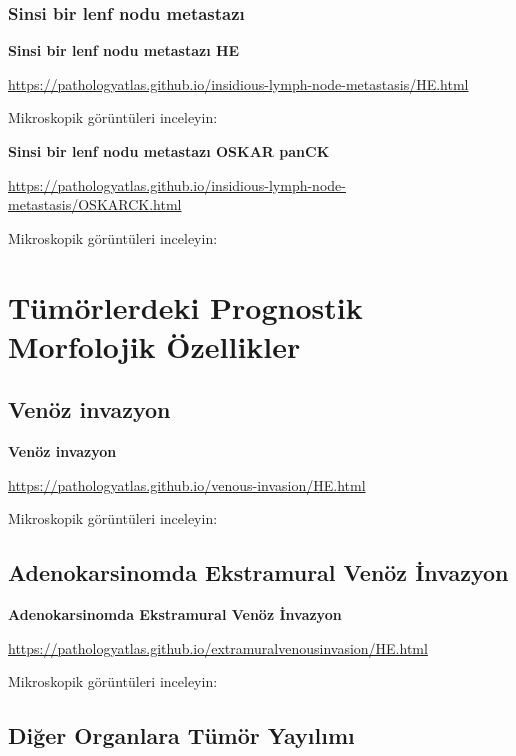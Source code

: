 \documentclass[
  letterpaper,
  DIV=11,
  numbers=noendperiod]{scrreprt}
\begin{document}
\hypertarget{sinsi-bir-lenf-nodu-metastazux131}{%
\section{Sinsi bir lenf nodu
metastazı}\label{sinsi-bir-lenf-nodu-metastazux131}}

\textbf{Sinsi bir lenf nodu metastazı HE}

\url{https://pathologyatlas.github.io/insidious-lymph-node-metastasis/HE.html}

Mikroskopik görüntüleri inceleyin:

\textbf{Sinsi bir lenf nodu metastazı OSKAR panCK}

\url{https://pathologyatlas.github.io/insidious-lymph-node-metastasis/OSKARCK.html}

Mikroskopik görüntüleri inceleyin:

\part{Tümörlerdeki Prognostik Morfolojik Özellikler}

\hypertarget{venuxf6z-invazyon}{%
\chapter{Venöz invazyon}\label{venuxf6z-invazyon}}

\textbf{Venöz invazyon}

\url{https://pathologyatlas.github.io/venous-invasion/HE.html}

Mikroskopik görüntüleri inceleyin:

\hypertarget{adenokarsinomda-ekstramural-venuxf6z-invazyon}{%
\chapter{Adenokarsinomda Ekstramural Venöz
İnvazyon}\label{adenokarsinomda-ekstramural-venuxf6z-invazyon}}

\textbf{Adenokarsinomda Ekstramural Venöz İnvazyon}

\url{https://pathologyatlas.github.io/extramuralvenousinvasion/HE.html}

Mikroskopik görüntüleri inceleyin:

\hypertarget{diux11fer-organlara-tuxfcmuxf6r-yayux131lux131mux131}{%
\chapter{Diğer Organlara Tümör
Yayılımı}\label{diux11fer-organlara-tuxfcmuxf6r-yayux131lux131mux131}}
\end{document}
